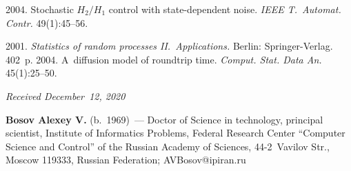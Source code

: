 \begin{multicols}{2}
{{\begin{thebibliography}{9}
      2004. Stochastic $H_2/H_1$ control with  
state-dependent noise. \textit{IEEE T.~Automat. Contr.} 49(1):45--56.

\pagebreak

      2001. \textit{Statistics of random processes 
II.~Applications.} Berlin: Springer-Verlag. 402~p.
      2004. A~diffusion model of roundtrip time. 
\textit{Comput. Stat. Data An.} 45(1):25--50.
 \end{thebibliography}

 }
 }

\end{multicols}

\vspace*{-3pt}

  \hfill{\small\textit{Received December~12, 2020}}



      
      \Contrl
      
      \noindent
      \textbf{Bosov Alexey V.} (b.\ 1969)~--- Doctor of Science in technology, principal 
scientist, Institute of Informatics Problems, Federal Research Center ``Computer Science and 
Control'' of the Russian Academy of Sciences, 44-2~Vavilov Str., Moscow 119333, Russian 
Federation; \mbox{AVBosov@ipiran.ru}
     
\label{end\stat}

\renewcommand{\bibname}{\protect\rm Литература}

      